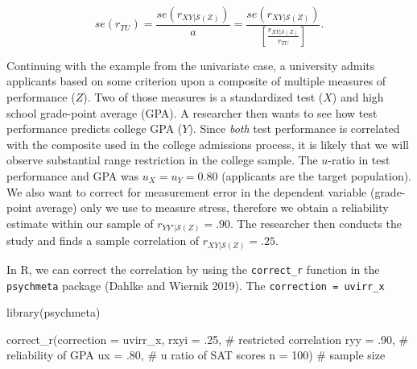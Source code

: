 \documentclass[
  letterpaper,
  DIV=11,
  numbers=noendperiod]{scrreprt}
\newenvironment{Shaded}{}{}
\newcommand{\AttributeTok}[1]{\textcolor[rgb]{0.00,0.34,0.68}{#1}}
\newcommand{\CommentTok}[1]{\textcolor[rgb]{0.54,0.53,0.53}{#1}}
\newcommand{\DecValTok}[1]{\textcolor[rgb]{0.69,0.50,0.00}{#1}}
\newcommand{\FunctionTok}[1]{\textcolor[rgb]{0.39,0.29,0.61}{#1}}
\newcommand{\NormalTok}[1]{\textcolor[rgb]{0.12,0.11,0.11}{#1}}
\newcommand{\StringTok}[1]{\textcolor[rgb]{0.75,0.01,0.01}{#1}}
\begin{document}
\[
se(r_{TU}) = \frac{se\left(r_{XY|\mathcal{S}(Z)}\right)}{\hat{a}}= \frac{se\left(r_{XY|\mathcal{S}(Z)}\right)}{\left[\frac{r_{XY|\mathcal{S}(Z)}}{r_{TU}}\right]}.
\]

\begin{tcolorbox}[enhanced jigsaw, opacityback=0, coltitle=black, toprule=.15mm, colframe=quarto-callout-note-color-frame, bottomtitle=1mm, rightrule=.15mm, colbacktitle=quarto-callout-note-color!10!white, left=2mm, bottomrule=.15mm, breakable, title={Applied Example in R}, colback=white, opacitybacktitle=0.6, titlerule=0mm, arc=.35mm, leftrule=.75mm, toptitle=1mm]

Continuing with the example from the univariate case, a university
admits applicants based on some criterion upon a composite of multiple
measures of performance (\(Z\)). Two of those measures is a standardized
test (\(X\)) and high school grade-point average (GPA). A researcher
then wants to see how test performance predicts college GPA (\(Y\)).
Since \emph{both} test performance is correlated with the composite used
in the college admissions process, it is likely that we will observe
substantial range restriction in the college sample. The \(u\)-ratio in
test performance and GPA was \(u_{X}=u_{Y}=0.80\) (applicants are the
target population). We also want to correct for measurement error in the
dependent variable (grade-point average) only we use to measure stress,
therefore we obtain a reliability estimate within our sample of
\(r_{YY'|\mathcal{S}(Z)}=.90\). The researcher then conducts the study
and finds a sample correlation of \(r_{XY|\mathcal{S}(Z)}=.25\).

In R, we can correct the correlation by using the \texttt{correct\_r}
function in the \texttt{psychmeta} package (Dahlke and Wiernik 2019).
The \texttt{correction\ =\ \textquotesingle{}uvirr\_x\textquotesingle{}}

\begin{Shaded}
\begin{Highlighting}[]
\FunctionTok{library}\NormalTok{(psychmeta)}

\FunctionTok{correct\_r}\NormalTok{(}\AttributeTok{correction =} \StringTok{\textquotesingle{}uvirr\_x\textquotesingle{}}\NormalTok{,}
          \AttributeTok{rxyi =}\NormalTok{ .}\DecValTok{25}\NormalTok{,  }\CommentTok{\# restricted correlation}
          \AttributeTok{ryy =}\NormalTok{ .}\DecValTok{90}\NormalTok{,  }\CommentTok{\# reliability of GPA}
          \AttributeTok{ux =}\NormalTok{ .}\DecValTok{80}\NormalTok{,   }\CommentTok{\# u ratio of SAT scores}
          \AttributeTok{n =} \DecValTok{100}\NormalTok{)    }\CommentTok{\# sample size}
\end{Highlighting}
\end{Shaded}


\end{tcolorbox}
\end{document}

